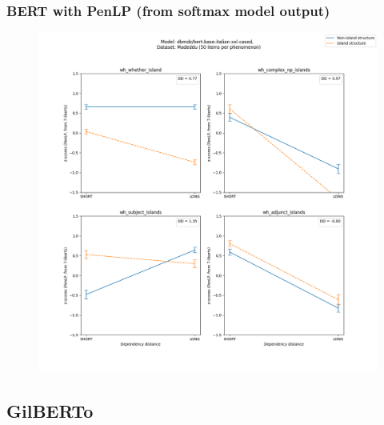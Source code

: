 \subsubsection{BERT with PenLP (from softmax model output)}
\begin{figure}[h]
	\centering
	\includegraphics[width=1\textwidth]{images/AppendixA/Madeddu_wh_dbmdz_bert-base-italian-xxl-cased_PenLP-zscores-likert-2022-09-14_h15m34s07.png} 
\end{figure}


\clearpage
\subsection{GilBERTo}
